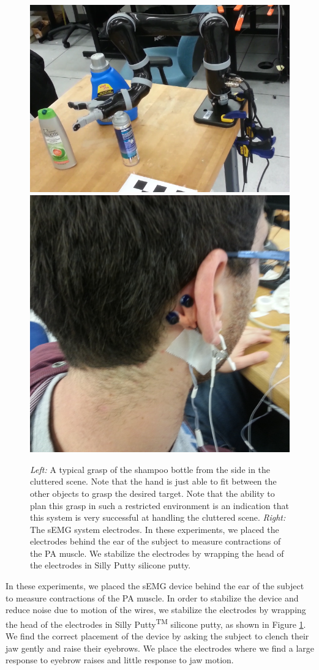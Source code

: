 \begin{figure}
\centering
\includegraphics[width=.49\textwidth]{images_4/semg_clutter_grasp.png}
\hspace{1mm}
\includegraphics[width=.49\textwidth,trim={30cm 40cm 20cm 20cm},clip=true]{user_semg_2.jpg}
\caption{\emph{Left:} A typical grasp of the shampoo bottle from the side in the cluttered scene. Note that the hand is just able to fit between the other objects to grasp the desired target. Note that the ability to plan this grasp in such a restricted environment is an indication that this system is very successful at handling the cluttered scene. \emph{Right:} The sEMG system electrodes. In these experiments, we placed the electrodes behind the ear of the subject to measure contractions of the PA muscle. We stabilize the electrodes by wrapping the head of the electrodes in Silly Putty silicone putty.}

\label{fig:silly-putty}
\end{figure}

In these experiments, we placed the sEMG device behind the ear of the subject to measure contractions of the PA muscle. In order to stabilize the device and reduce noise due to motion of the wires, we stabilize the electrodes by wrapping the head of the electrodes in Silly Putty\textsuperscript{TM} silicone putty, as shown in Figure \ref{fig:silly-putty}. We find the correct placement of the device by asking the subject to clench their jaw gently and raise their eyebrows. We place the electrodes where we find a large response to eyebrow raises and  little response to jaw motion.

